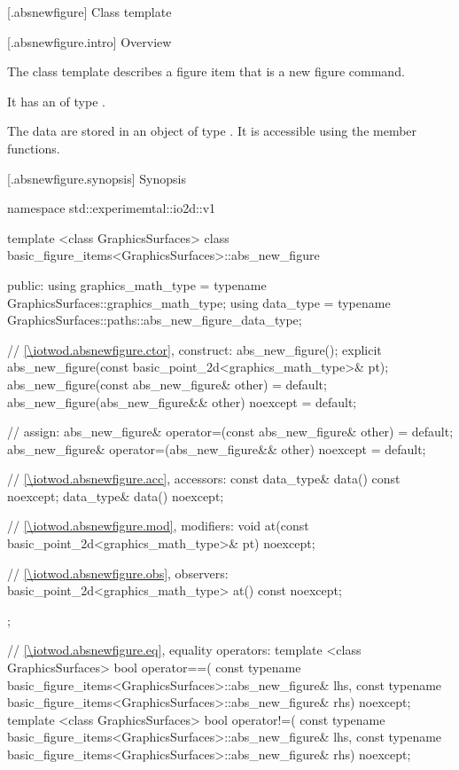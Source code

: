  [\iotwod.absnewfigure] {Class template }

 [\iotwod.absnewfigure.intro] {Overview}

\pnum
{}%
The class template  describes a figure item that is a new figure command.

\pnum
It has an  of type .

\pnum
The data are stored in an object of type . It is accessible using the  member functions.

 [\iotwod.absnewfigure.synopsis] {Synopsis}
\begin{codeblock}
namespace std::experimemtal::io2d::v1 {
  template <class GraphicsSurfaces>
  class basic_figure_items<GraphicsSurfaces>::abs_new_figure {
  public:
    using graphics_math_type = typename GraphicsSurfaces::graphics_math_type;
    using data_type =
      typename GraphicsSurfaces::paths::abs_new_figure_data_type;

    // \ref{\iotwod.absnewfigure.ctor}, construct:
    abs_new_figure();
    explicit abs_new_figure(const basic_point_2d<graphics_math_type>& pt);
    abs_new_figure(const abs_new_figure& other) = default;
    abs_new_figure(abs_new_figure&& other) noexcept = default;

    // assign:
    abs_new_figure& operator=(const abs_new_figure& other) = default;
    abs_new_figure& operator=(abs_new_figure&& other) noexcept = default;

    // \ref{\iotwod.absnewfigure.acc}, accessors:
    const data_type& data() const noexcept;
    data_type& data() noexcept;

    // \ref{\iotwod.absnewfigure.mod}, modifiers:
    void at(const basic_point_2d<graphics_math_type>& pt) noexcept;

    // \ref{\iotwod.absnewfigure.obs}, observers:
    basic_point_2d<graphics_math_type> at() const noexcept;
  };
  
  // \ref{\iotwod.absnewfigure.eq}, equality operators:
  template <class GraphicsSurfaces>
  bool operator==(
    const typename basic_figure_items<GraphicsSurfaces>::abs_new_figure& lhs,
    const typename basic_figure_items<GraphicsSurfaces>::abs_new_figure& rhs) 
    noexcept;  
  template <class GraphicsSurfaces>
  bool operator!=(
    const typename basic_figure_items<GraphicsSurfaces>::abs_new_figure& lhs,
    const typename basic_figure_items<GraphicsSurfaces>::abs_new_figure& rhs) 
    noexcept;  
}
\end{codeblock}

